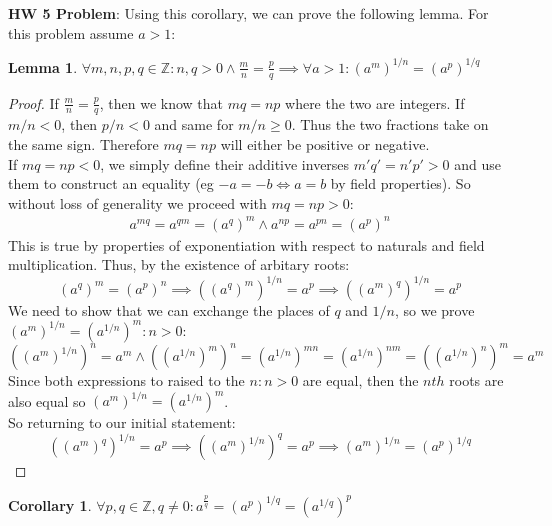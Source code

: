 \documentclass{article}
\newtheorem{lem}{Lemma}[section]
\newtheorem{cor}{Corollary}[section]
\begin{document}
\medskip
\textbf{HW 5 Problem}: Using this corollary, we can prove the following lemma. For this problem assume $a > 1$:
\begin{lem}
$\forall m, n, p, q \in \mathbb{Z}: n, q > 0 \land \frac{m}{n} = \frac{p}{q} \implies \forall a > 1: (a^m)^{1/n} = (a^p)^{1/q}$
\end{lem}
\begin{proof}
If $\frac{m}{n} = \frac{p}{q}$, then we know that $mq = np$ where the two are integers. If $m/n < 0$, then $p/n < 0$ and same for $m/n \geqslant 0$. Thus the two fractions take on the same sign. Therefore $mq = np$ will either be positive or negative.\\

If $mq = np < 0$, we simply define their additive inverses $m'q' = n'p' > 0$ and use them to construct an equality (eg $-a = -b \iff a = b$ by field properties). So without loss of generality we proceed with $mq = np > 0$:
\begin{eqnarray}
    a^{mq} = a^{qm} = (a^q)^m \land a^{np} = a^{pn} = (a^p)^n
\end{eqnarray}
This is true by properties of exponentiation with respect to naturals and field multiplication. Thus, by the existence of arbitary roots:
\begin{equation*}
    (a^q)^m = (a^p)^n \implies ((a^q)^m)^{1/n} = a^p \implies ((a^m)^q)^{1/n} = a^p
\end{equation*}
We need to show that we can exchange the places of $q$ and $1/n$, so we prove $(a^m)^{1/n} = (a^{1/n})^m: n > 0$:
\begin{equation*}
    ((a^m)^{1/n})^n = a^m \land ((a^{1/n})^m)^n = (a^{1/n})^{mn} = (a^{1/n})^{nm} = ((a^{1/n})^n)^m = a^m
\end{equation*}
Since both expressions to raised to the $n: n > 0$ are equal, then the $nth$ roots are also equal so $(a^m)^{1/n} = (a^{1/n})^m$.\\

So returning to our initial statement:
\begin{equation*}
    ((a^m)^q)^{1/n}  = a^p \implies ((a^m)^{1/n})^{q} = a^p \implies (a^m)^{1/n} = (a^p)^{1/q}
\end{equation*}
\end{proof}
\begin{cor}
$\forall p, q \in \mathbb{Z}, q \neq 0: a^\frac{p}{q} = (a^p)^{1/q} = (a^{1/q})^p$
\end{cor}
\end{document}
